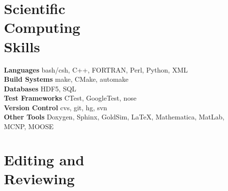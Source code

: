 \documentclass[margin,line]{resume}
\begin{document}
\begin{resume}
    \section{\mysidestyle Scientific\\Computing\\Skills}
                \textbf{Languages} \hfill bash/csh, C++, FORTRAN, Perl, Python, XML\vspace{.5mm}\\%
                \textbf{Build Systems} \hfill make, CMake, automake\vspace{.5mm}\\%
                \textbf{Databases} \hfill HDF5, SQL\vspace{.5mm}\\%
                \textbf{Test Frameworks} \hfill CTest, GoogleTest, nose\vspace{.5mm}\\%
                \textbf{Version Control} \hfill cvs, git, hg, svn\vspace{.5mm}\\%
                \textbf{Other Tools} \hfill Doxygen, Sphinx, GoldSim, \LaTeX, Mathematica, MatLab, MCNP, MOOSE\vspace{.5mm}%


    \section{\mysidestyle Editing and\\Reviewing}


\end{resume}
\end{document}
